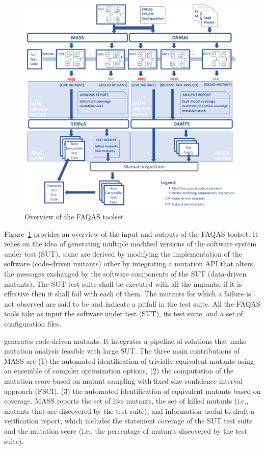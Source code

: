 \begin{figure}[tb]
\begin{center}
\includegraphics[width=\textwidth]{images/FAQAS-overview.pdf}
\caption{Overview of the FAQAS toolset}
\label{fig:FAQAS:toolset}
\end{center}
\end{figure}

Figure~\ref{fig:FAQAS:toolset} provides an overview of the input and outputs of the FAQAS toolset. It relies on the idea of generating multiple modified versions of the software system under test (SUT), some are derived by modifying the implementation of the software (code-driven mutants) other by integrating a mutation API that alters the messages exchanged by the software components of the SUT (data-driven mutants).
The SUT test suite shall be executed with all the mutants, if it is effective then it shall fail with each of them. The mutants for which a failure is not observed are said to be  and indicate a pitfall in the test suite.
All the FAQAS tools take as input the software under test (SUT), its test suite, and a set of configuration files.

 generates code-driven mutants. It integrates a pipeline of solutions that make mutation analysis feasible with large SUT. The three main contributions of MASS are (1) the automated identification of trivially equivalent mutants using an ensemble of compiler optimization options, (2) the computation of the mutation score based on mutant sampling with fixed size confidence interval approach (FSCI), (3) the automated identification of equivalent mutants based on coverage.
MASS reports the set of live mutants, the set of killed mutants (i.e., mutants that are discovered by the test suite), and information useful to draft a verification report, which includes the statement coverage of the SUT test suite and the mutation score (i.e., the percentage of mutants discovered by the test suite).

